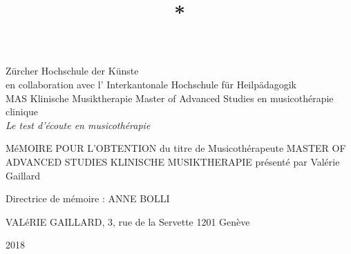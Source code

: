 \title{{*}}

\maketitle
\begin{titlepage}
 \begin{center}
    \Large
     Zürcher Hochschule der Künste\\
 	en collaboration avec l' Interkantonale Hochschule für Heilpädagogik \\
	 MAS Klinische Musiktherapie Master of Advanced Studies en musicothérapie clinique\\
  \vfill
  { \LARGE
\emph{Le test d'écoute en musicothérapie }\\ \bigskip
	 }
 \vfill
 \end{center}
MéMOIRE  POUR L'OBTENTION  du titre de
Musicothérapeute
MASTER OF ADVANCED STUDIES KLINISCHE MUSIKTHERAPIE présenté par Valérie Gaillard

{\large Directrice de mémoire : ANNE  BOLLI}


 {\large

	 VALéRIE GAILLARD, 3, rue de la Servette   \hfill 1201 Genève\\
	 \rule{0mm}{1pt} \hfill  2018}

\end{titlepage}
